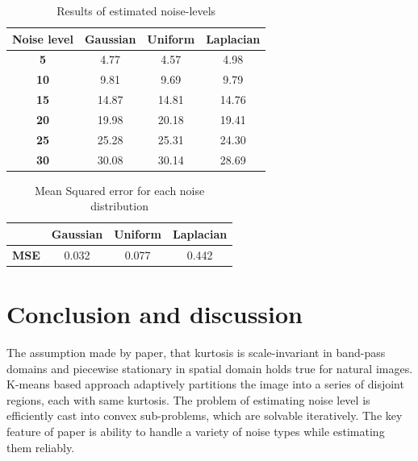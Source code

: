 \documentclass[11pt]{article}
\begin{document}
\begin{table}[H]
\centering
\begin{tabular}{|c|c|c|c|}
\hline
\textbf{Noise level} & \textbf{Gaussian} & \textbf{Uniform} & \textbf{Laplacian} \\ \hline
\textbf{5}           & 4.77              & 4.57             & 4.98               \\ \hline
\textbf{10}          & 9.81              & 9.69             & 9.79               \\ \hline
\textbf{15}          & 14.87             & 14.81            & 14.76              \\ \hline
\textbf{20}          & 19.98             & 20.18            & 19.41              \\ \hline
\textbf{25}          & 25.28              & 25.31            & 24.30              \\ \hline
\textbf{30}          & 30.08             & 30.14            & 28.69              \\ \hline
\end{tabular}
\caption{Results of estimated noise-levels}
\label{table:results}
\end{table}
\vspace{-0.5cm}
\begin{table}[H]
\centering
\begin{tabular}{|c|c|c|c|}
\hline
\textbf{}    & \textbf{Gaussian} & \textbf{Uniform} & \textbf{Laplacian} \\ \hline
\textbf{MSE} & 0.032             & 0.077            & 0.442              \\ \hline
\end{tabular}
\caption{Mean Squared error for each noise distribution}
\label{mse}
\end{table}
\vspace{-0.5cm}
\section{Conclusion and discussion}
The assumption made by paper, that kurtosis is scale-invariant in band-pass domains and piecewise stationary in spatial domain holds true for natural images. K-means based approach adaptively partitions the image into a series of disjoint regions, each with same kurtosis. The problem of estimating noise level is efficiently cast into convex sub-problems, which are solvable iteratively. The key feature of paper is ability to handle a variety of noise types while estimating them reliably.
\vspace{-0.5cm}


\end{document}
